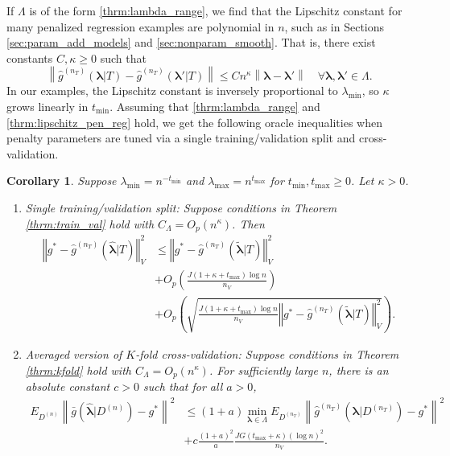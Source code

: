 \documentclass[12pt]{article} %
\newtheorem{corollary}{Corollary}
\theoremstyle{definition}
\begin{document}
If $\Lambda$ is of the form \eqref{thrm:lambda_range}, we find that the Lipschitz constant for many penalized regression examples are polynomial in $n$, such as in Sections \ref{sec:param_add_models} and \ref{sec:nonparam_smooth}. That is, there exist constants $C, \kappa \ge 0$ such that
\begin{equation}
\label{thrm:lipschitz_pen_reg}
\left \| \hat{g}^{(n_T)}(\boldsymbol{\lambda}|T) - \hat{g}^{(n_T)}(\boldsymbol{\lambda}'|T) \right \| \le C n^\kappa \left \| \boldsymbol{\lambda} - \boldsymbol{\lambda}' \right \| \quad \forall \boldsymbol{\lambda}, \boldsymbol{\lambda}' \in \Lambda.
\end{equation}
In our examples, the Lipschitz constant is inversely proportional to $\lambda_{\min}$, so $\kappa$ grows linearly in $t_{\min}$. Assuming that \eqref{thrm:lambda_range} and \eqref{thrm:lipschitz_pen_reg} hold, we get the following oracle inequalities when penalty parameters are tuned via a single training/validation split and cross-validation. 
\begin{corollary}
	\label{corr:penalized_reg}
	Suppose $\lambda_{\min} = n^{-t_{\min}}$ and $\lambda_{\max} = n^{t_{\max}}$ for $t_{\min}, t_{\max} \ge 0$. Let $\kappa  > 0$.
	
	\begin{enumerate}
		\item Single training/validation split: Suppose conditions in Theorem \ref{thrm:train_val} hold with $C_\Lambda = O_p (n^\kappa)$. Then
		\begin{align*}
		\left\Vert g^* - \hat{g}^{(n_T)}( \hat{\boldsymbol{\lambda}} | T) \right\Vert _{V}^2
		&\le \left\Vert g^* - \hat{g}^{(n_T)}( \tilde{\boldsymbol{\lambda}} | T) \right \Vert^2_{V}\\
		& + O_p \left(\frac{J (1 + \kappa + t_{\max})\log n}{n_{V}} \right) 
		\\
		& + O_p \left(
		\sqrt{
			\frac{J (1 + \kappa + t_{\max})\log n}{n_{V}}
			\left\Vert g^* - \hat{g}^{(n_T)}( \tilde{\boldsymbol{\lambda}}| T) \right \Vert^2_{V}
		}
		\right ).
		\end{align*}
		
		\item Averaged version of $K$-fold cross-validation: Suppose conditions in Theorem \ref{thrm:kfold}  hold with $C_\Lambda = O_p(n^\kappa)$. For sufficiently large $n$, there is an absolute constant $c > 0$ such that for all $a > 0$,
		\begin{align*}
			E_{D^{(n)}} \left \| \bar{g} ( \hat{\boldsymbol \lambda} | {D^{(n)}} ) - g^* \right \|^2 &\le
			(1+a) \min_{\boldsymbol{\lambda} \in \Lambda}  E_{D^{(n_T)}} \left \| \hat{g}^{(n_T)}(\boldsymbol \lambda | D^{(n_T)}) - g^* \right \|^2 \\
			& + c \frac{(1+a)^2}{a} 
			\frac{JG (t_{\max} + \kappa) (\log n)^2 }{n_V}. 
		\end{align*}
	\end{enumerate}
\end{corollary}
\end{document}
